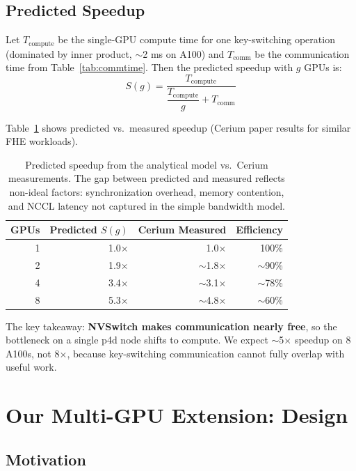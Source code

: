 \documentclass[11pt,letterpaper]{article}
\begin{document}
\subsection{Predicted Speedup}

Let $T_\text{compute}$ be the single-GPU compute time for one key-switching operation
(dominated by inner product, $\sim$2 ms on A100) and $T_\text{comm}$ be the communication
time from Table~\ref{tab:commtime}. Then the predicted speedup with $g$ GPUs is:
\[
S(g) = \frac{T_\text{compute}}{\dfrac{T_\text{compute}}{g} + T_\text{comm}}
\]

Table~\ref{tab:speedup} shows predicted vs.\ measured speedup (Cerium paper results for
similar FHE workloads).

\begin{table}[h]
\centering
\begin{tabular}{@{}rrrr@{}}
\toprule
\textbf{GPUs} & \textbf{Predicted} $S(g)$ & \textbf{Cerium Measured} & \textbf{Efficiency} \\
\midrule
1  & 1.0$\times$ & 1.0$\times$  & 100\% \\
2  & 1.9$\times$ & $\sim$1.8$\times$ & $\sim$90\% \\
4  & 3.4$\times$ & $\sim$3.1$\times$ & $\sim$78\% \\
8  & 5.3$\times$ & $\sim$4.8$\times$ & $\sim$60\% \\
\bottomrule
\end{tabular}
\caption{Predicted speedup from the analytical model vs.\ Cerium measurements. The gap
between predicted and measured reflects non-ideal factors: synchronization overhead, memory
contention, and NCCL latency not captured in the simple bandwidth model.}
\label{tab:speedup}
\end{table}

The key takeaway: \textbf{NVSwitch makes communication nearly free}, so the bottleneck on a
single p4d node shifts to compute. We expect $\sim$5$\times$ speedup on 8 A100s, not 8$\times$,
because key-switching communication cannot fully overlap with useful work.

\section{Our Multi-GPU Extension: Design}
\label{sec:multigpu}

\subsection{Motivation}
\end{document}
